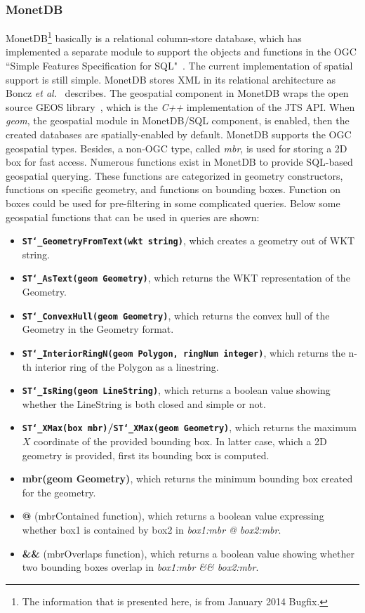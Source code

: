 \documentclass[a4paper,12pt]{article}
\begin{document}
\subsubsection{MonetDB}
MonetDB\footnote{The information that is presented here, is from January 2014 Bugfix.} basically is a relational column-store database, which has implemented a separate module to support the objects and functions in the OGC ``Simple Features Specification for SQL"~\cite{ogcsfs}. The current implementation of spatial support is still simple. MonetDB stores XML in its relational architecture as Boncz \emph{et al.}~\cite{Boncz2006} describes. The geospatial component in MonetDB wraps the open source GEOS library~\cite{GEOS},
which is the \textit{C++} implementation of the JTS API. When \textit{geom}, the geospatial module in MonetDB/SQL component, is enabled, then the created databases are spatially-enabled by default. MonetDB supports the OGC geospatial types. Besides, a non-OGC type, called \textit{mbr}, is used for storing a 2D box for fast access. Numerous functions exist in MonetDB to provide SQL-based geospatial querying. These functions are categorized in geometry constructors, functions on specific geometry, and functions on bounding boxes. Function on boxes could be used for pre-filtering in some complicated queries. Below some geospatial functions that can be used in queries are shown:
\begin{itemize}
\item \textbf{\texttt{ST\char`_GeometryFromText(wkt string)}}, which creates a geometry out of WKT string.
\item \textbf{\texttt{ST\char`_AsText(geom Geometry)}}, which returns the WKT representation of the Geometry.
\item \textbf{\texttt{ST\char`_ConvexHull(geom Geometry)}}, which returns the convex hull of the Geometry in the Geometry format.
\item \textbf{\texttt{ST\char`_InteriorRingN(geom Polygon, ringNum integer)}}, which returns the n-th interior ring of the Polygon as a linestring.
\item \textbf{\texttt{ST\char`_IsRing(geom LineString)}}, which returns a boolean value showing whether the LineString is both closed and simple or not.
\item \textbf{\texttt{ST\char`_XMax(box mbr)}/\texttt{ST\char`_XMax(geom Geometry)}}, which returns the maximum $X$ coordinate of the provided bounding box. In latter case, which a 2D geometry is provided, first its bounding box is computed.
\item \textbf{mbr(geom Geometry)}, which returns the minimum bounding box created for the geometry.
\item \textbf{@} (mbrContained function), which returns a boolean value expressing whether box1 is contained by box2 in \textit{box1:mbr @ box2:mbr}.
\item \textbf{\&\&} (mbrOverlaps function), which returns a boolean value showing whether two bounding boxes overlap in \textit{box1:mbr \&\& box2:mbr}.

\end{itemize}
\end{document}
